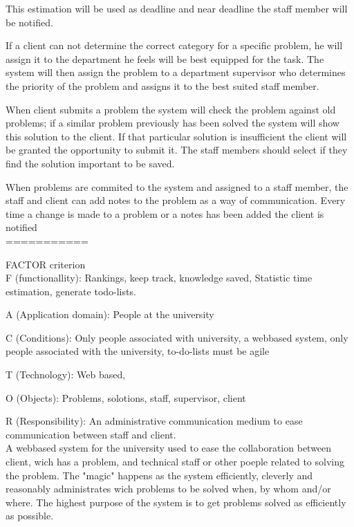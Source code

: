 This estimation will be used as deadline and near deadline the staff member will be notified.

If a client can not determine the correct category for a specific problem, he will assign it to the department he feels will be best equipped for the task. The system will then assign the problem to a department supervisor who determines the priority of the problem and assigns it to the best suited staff member. 

When client submits a problem the system will check the problem against old problems; if a similar problem previously has been solved the system will show this solution to the client. If that particular solution is insufficient the client will be granted the opportunity to submit it. The staff members should select if they find the solution important to be saved.

When problems are commited to the system and assigned to a staff member, the staff and client can add notes to the problem as a way of communication. Every time a change is made to a problem or a notes has been added the client is notified\\
===========





FACTOR criterion\\
F (functionallity): Rankings, keep track, knowledge saved, Statistic time estimation, generate todo-lists.

A (Application domain): People at the university

C (Conditions): Only people associated with university, a webbased system, only people associated with the university, to-do-lists must be agile

T (Technology): Web based, 

O (Objects): Problems, solotions, staff, supervisor, client

R (Responsibility): An administrative communication medium to ease communication between staff and client.\\










A webbased system for the university used to ease the collaboration between client, wich has a problem, and technical staff or other poeple related to solving the problem. The "magic" happens as the system efficiently, cleverly and reasonably administrates wich problems to be solved when, by whom and/or where. The highest purpose of the system is to get problems solved as efficiently as possible.\\



